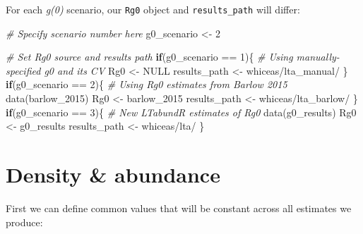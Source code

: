 \documentclass[
]{book}
\newenvironment{Shaded}{\begin{snugshade}}{\end{snugshade}}
\newcommand{\CommentTok}[1]{\textcolor[rgb]{0.56,0.35,0.01}{\textit{#1}}}
\newcommand{\ConstantTok}[1]{\textcolor[rgb]{0.00,0.00,0.00}{#1}}
\newcommand{\ControlFlowTok}[1]{\textcolor[rgb]{0.13,0.29,0.53}{\textbf{#1}}}
\newcommand{\DecValTok}[1]{\textcolor[rgb]{0.00,0.00,0.81}{#1}}
\newcommand{\FunctionTok}[1]{\textcolor[rgb]{0.00,0.00,0.00}{#1}}
\newcommand{\NormalTok}[1]{#1}
\newcommand{\OtherTok}[1]{\textcolor[rgb]{0.56,0.35,0.01}{#1}}
\newcommand{\SpecialCharTok}[1]{\textcolor[rgb]{0.00,0.00,0.00}{#1}}
\newcommand{\StringTok}[1]{\textcolor[rgb]{0.31,0.60,0.02}{#1}}
\begin{document}
For each \emph{g(0)} scenario, our \texttt{Rg0} object and \texttt{results\_path} will differ:

\begin{Shaded}
\begin{Highlighting}[]
\CommentTok{\# Specify scenario number here}
\NormalTok{g0\_scenario }\OtherTok{\textless{}{-}} \DecValTok{2}
\end{Highlighting}
\end{Shaded}

\begin{Shaded}
\begin{Highlighting}[]
\CommentTok{\# Set Rg0 source and results path}
\ControlFlowTok{if}\NormalTok{(g0\_scenario }\SpecialCharTok{==} \DecValTok{1}\NormalTok{)\{ }\CommentTok{\# Using manually{-}specified g0 and its CV}
\NormalTok{  Rg0 }\OtherTok{\textless{}{-}} \ConstantTok{NULL}
\NormalTok{  results\_path }\OtherTok{\textless{}{-}} \StringTok{\textquotesingle{}whiceas/lta\_manual/\textquotesingle{}}
\NormalTok{\}}
\ControlFlowTok{if}\NormalTok{(g0\_scenario }\SpecialCharTok{==} \DecValTok{2}\NormalTok{)\{ }\CommentTok{\# Using Rg0 estimates from Barlow 2015}
  \FunctionTok{data}\NormalTok{(barlow\_2015)}
\NormalTok{  Rg0 }\OtherTok{\textless{}{-}}\NormalTok{ barlow\_2015}
\NormalTok{  results\_path }\OtherTok{\textless{}{-}} \StringTok{\textquotesingle{}whiceas/lta\_barlow/\textquotesingle{}}
\NormalTok{\}}
\ControlFlowTok{if}\NormalTok{(g0\_scenario }\SpecialCharTok{==} \DecValTok{3}\NormalTok{)\{ }\CommentTok{\# New LTabundR estimates of Rg0}
  \FunctionTok{data}\NormalTok{(g0\_results)}
\NormalTok{  Rg0 }\OtherTok{\textless{}{-}}\NormalTok{ g0\_results}
\NormalTok{  results\_path }\OtherTok{\textless{}{-}} \StringTok{\textquotesingle{}whiceas/lta/\textquotesingle{}}
\NormalTok{\}}
\end{Highlighting}
\end{Shaded}

\hypertarget{density-abundance}{%
\section*{Density \& abundance}\label{density-abundance}}

First we can define common values that will be constant across all estimates we produce:
\end{document}
